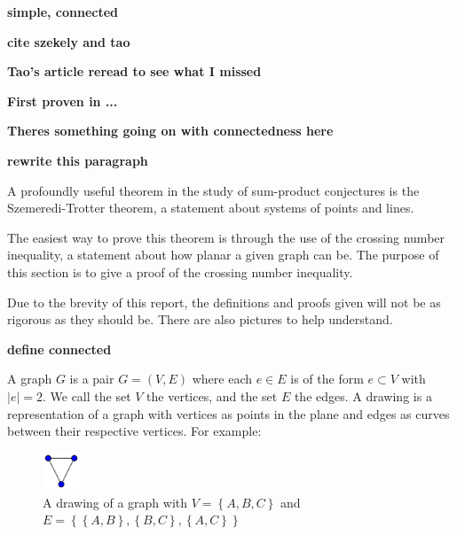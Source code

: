 \documentclass[12pt,reqno]{amsart}
\begin{document}
\textbf{simple, connected}

\textbf{cite szekely and tao}

\textbf{Tao's article reread to see what I missed}

\textbf{First proven in ...}

\textbf{Theres something going on with connectedness here}


\textbf{rewrite this paragraph}

A profoundly useful theorem in the study of sum-product conjectures is the
Szemeredi-Trotter theorem, a statement about systems of points and lines.

The easiest way to prove this theorem is through the use of the crossing number inequality,
a statement about how planar a given graph can be. The purpose of this section is to give a proof
of the crossing number inequality.

Due to the brevity of this report, the definitions and proofs given will not be
as rigorous as they should be. There are also pictures to help understand.



\textbf{define connected}

A graph \(G\) is a pair \(G = (V,E)\) where each \(e \in E\) is of the form \(e \subset V\) with \(\left\lvert e \right\rvert = 2\).
We call the set \(V\) the vertices, and the set \(E\) the edges. A drawing is
a representation of a graph with vertices as points in the plane and edges as curves between their
respective vertices. For example:

\begin{figure}[h]
    \centering
    \includegraphics[width=0.1\textwidth]{3graph.png}
    \caption{A drawing of a graph with \(V = \left\{ A,B,C \right\}\) and \(E = \left\{ \left\{ A,B \right\} , \left\{ B,C \right\} ,\left\{ A,C \right\}  \right\} \)}
\end{figure}
\end{document}
